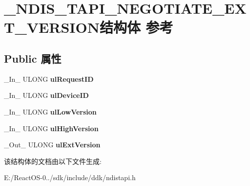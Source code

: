 \hypertarget{struct___n_d_i_s___t_a_p_i___n_e_g_o_t_i_a_t_e___e_x_t___v_e_r_s_i_o_n}{}\section{\+\_\+\+N\+D\+I\+S\+\_\+\+T\+A\+P\+I\+\_\+\+N\+E\+G\+O\+T\+I\+A\+T\+E\+\_\+\+E\+X\+T\+\_\+\+V\+E\+R\+S\+I\+O\+N结构体 参考}
\label{struct___n_d_i_s___t_a_p_i___n_e_g_o_t_i_a_t_e___e_x_t___v_e_r_s_i_o_n}
\subsection*{Public 属性}
\begin{DoxyCompactItemize}
\item 
\mbox{\label{struct___n_d_i_s___t_a_p_i___n_e_g_o_t_i_a_t_e___e_x_t___v_e_r_s_i_o_n_a92a58e426a42c1708cf8e5bcb531f609}} 
\+\_\+\+In\+\_\+ U\+L\+O\+NG {\bfseries ul\+Request\+ID}
\item 
\mbox{\label{struct___n_d_i_s___t_a_p_i___n_e_g_o_t_i_a_t_e___e_x_t___v_e_r_s_i_o_n_a2a2c162fab9d41e4e4167bdad7a8bdcf}} 
\+\_\+\+In\+\_\+ U\+L\+O\+NG {\bfseries ul\+Device\+ID}
\item 
\mbox{\label{struct___n_d_i_s___t_a_p_i___n_e_g_o_t_i_a_t_e___e_x_t___v_e_r_s_i_o_n_aaadfc9e221b857291ace47813c827416}} 
\+\_\+\+In\+\_\+ U\+L\+O\+NG {\bfseries ul\+Low\+Version}
\item 
\mbox{\label{struct___n_d_i_s___t_a_p_i___n_e_g_o_t_i_a_t_e___e_x_t___v_e_r_s_i_o_n_a36caaa83151032cb5d8effcbdd9e4c1f}} 
\+\_\+\+In\+\_\+ U\+L\+O\+NG {\bfseries ul\+High\+Version}
\item 
\mbox{\label{struct___n_d_i_s___t_a_p_i___n_e_g_o_t_i_a_t_e___e_x_t___v_e_r_s_i_o_n_ad49a1597c09c2543b80744c7a8fb4255}} 
\+\_\+\+Out\+\_\+ U\+L\+O\+NG {\bfseries ul\+Ext\+Version}
\end{DoxyCompactItemize}


该结构体的文档由以下文件生成\+:\begin{DoxyCompactItemize}
\item 
E\+:/\+React\+O\+S-\/0../sdk/include/ddk/ndistapi.\+h\end{DoxyCompactItemize}
